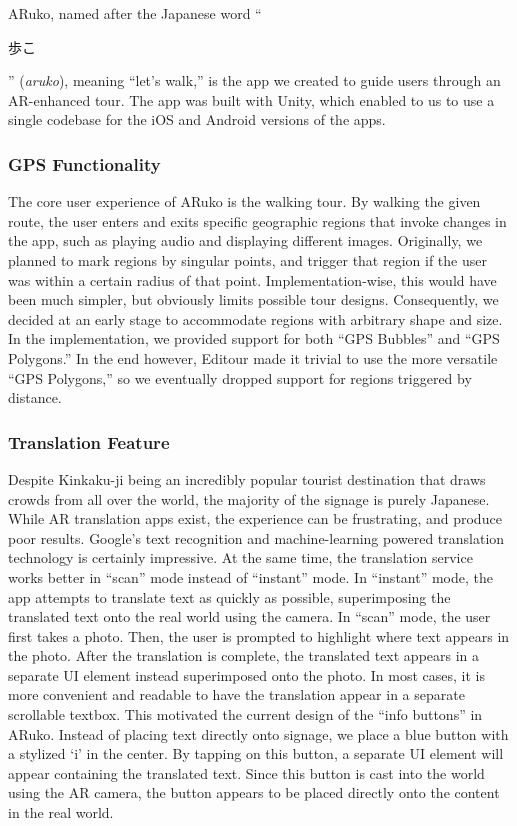 \documentclass[a4paper, 10pt, american, titlepage]{article}
\begin{document}
ARuko, named after the Japanese word ``\begin{CJK}{UTF8}{min}歩こ\end{CJK}''
(\textit{aruko}), meaning ``let's walk,'' is the app we created to guide users
through an AR-enhanced tour. The app was built with Unity, which enabled to us
to use a single codebase for the iOS and Android versions of the apps.

\subsubsection{GPS Functionality}
\label{sec:gpsFunctionality}

The core user experience of ARuko is the walking tour. By walking the given
route, the user enters and exits specific geographic regions that invoke
changes in the app, such as playing audio and displaying different images.
Originally, we planned to mark regions by singular points, and trigger that
region if the user was within a certain radius of that point.
Implementation-wise, this would have been much simpler, but obviously limits
possible tour designs. Consequently, we decided at an early stage to
accommodate regions with arbitrary shape and size.  In the implementation, we
provided support for both ``GPS Bubbles'' and ``GPS Polygons.'' In the end
however, Editour made it trivial to use the more versatile ``GPS Polygons,'' so
we eventually dropped support for regions triggered by distance.

\subsubsection{Translation Feature}
\label{sec:translationFeature}

Despite Kinkaku-ji being an incredibly popular tourist destination that draws
crowds from all over the world, the majority of the signage is purely Japanese.
While AR translation apps exist, the experience can be frustrating, and produce
poor results. Google's text recognition and machine-learning powered translation
technology is certainly impressive. At the same time, the translation service
works better in ``scan'' mode instead of ``instant'' mode. In ``instant'' mode,
the app attempts to translate text as quickly as possible, superimposing the
translated text onto the real world using the camera. In ``scan'' mode, the user
first takes a photo. Then, the user is prompted to highlight where text appears
in the photo. After the translation is complete, the translated text appears in
a separate UI element instead superimposed onto the photo. In most cases, it is
more convenient and readable to have the translation appear in a separate
scrollable textbox. This motivated the current design of the ``info buttons'' in
ARuko. Instead of placing text directly onto signage, we place a blue button
with a stylized `i' in the center. By tapping on this button, a separate UI
element will appear containing the translated text. Since this button is cast
into the world using the AR camera, the button appears to be placed directly
onto the content in the real world.
\end{document}
